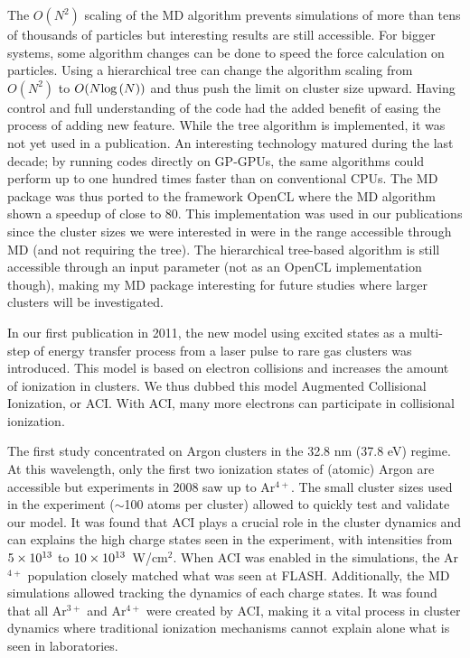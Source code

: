 The $O(N^2)$ scaling of the MD algorithm prevents simulations of more than tens
of thousands of particles but interesting results are still accessible.
For bigger systems, some algorithm changes can be done to speed the force
calculation on particles. Using a hierarchical tree can change the algorithm
scaling from $O(N^2)$ to $O(N \textrm{log}\left( N \right))$ and thus push the limit on
cluster size upward. Having control and full understanding of the code had
the added benefit of easing the process of adding new feature. While the tree
algorithm is implemented, it was not yet used in a publication. An interesting
technology matured during the last decade; by running codes directly on GP-GPUs,
the same algorithms could perform up to one hundred times faster than on
conventional CPUs. The MD package was thus ported to the framework OpenCL where
the MD algorithm shown a speedup of close to 80. This implementation was used
in our publications since the cluster sizes we were interested in were
in the range accessible through MD (and not requiring the tree). The
hierarchical tree-based algorithm is still accessible through an input parameter
(not as an OpenCL implementation though), making my MD package interesting for
future studies where larger clusters will be investigated.

In our first publication in 2011, the new model using excited states as a
multi-step of energy transfer process from a laser pulse to rare gas clusters
was introduced. This model is based on electron collisions and increases the
amount of ionization in clusters. We thus dubbed this model Augmented
Collisional Ionization, or ACI. With ACI, many more electrons can participate in
collisional ionization.

The first study concentrated on Argon clusters in the 32.8 nm (37.8 eV) regime.
At this wavelength, only the first two ionization states of (atomic) Argon are
accessible but experiments in 2008 saw up to Ar$^{4+}$. The small cluster sizes
used in the experiment ($\sim$100 atoms per cluster) allowed to quickly test and
validate our model. It was found that ACI plays a crucial role in the cluster
dynamics and can explains the high charge states seen in the experiment, with
intensities from $\ten{5}{13}$ to $\ten{10}{13}$~W/cm$^{2}$. When ACI was
enabled in the simulations, the Ar$^{4+}$ population closely matched what was
seen at FLASH. Additionally, the MD simulations allowed tracking the dynamics
of each charge states. It was found that all Ar$^{3+}$ and Ar$^{4+}$ were
created by ACI, making it a vital process in cluster dynamics where traditional
ionization mechanisms cannot explain alone what is seen in laboratories.

